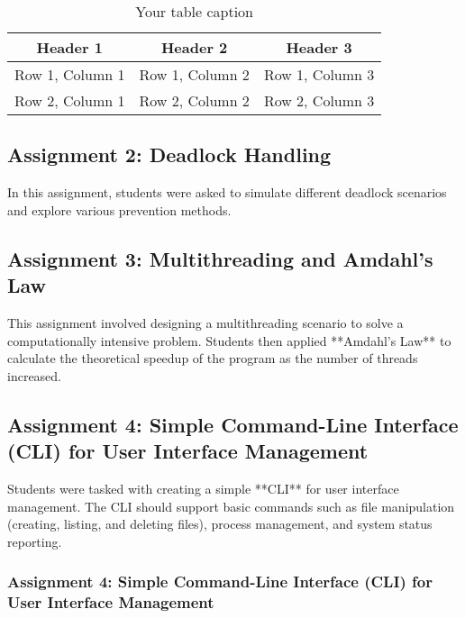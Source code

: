 \documentclass[12pt]{article}
\begin{document}
\begin{table}[htbp] %
    \centering
    \begin{tabular}{|c|c|c|} %
    \hline
    Header 1 & Header 2 & Header 3 \\ %
    \hline
    Row 1, Column 1 & Row 1, Column 2 & Row 1, Column 3 \\ %
    \hline
    Row 2, Column 1 & Row 2, Column 2 & Row 2, Column 3 \\ %
    \hline
    \end{tabular}
    \caption{Your table caption} %
    \label{tab:your_label} %
\end{table}

\subsection{Assignment 2: Deadlock Handling}
In this assignment, students were asked to simulate different deadlock scenarios and explore various prevention methods.

\subsection{Assignment 3: Multithreading and Amdahl's Law}
This assignment involved designing a multithreading scenario to solve a computationally intensive problem. Students then applied **Amdahl's Law** to calculate the theoretical speedup of the program as the number of threads increased.

\subsection{Assignment 4: Simple Command-Line Interface (CLI) for User Interface Management}
Students were tasked with creating a simple **CLI** for user interface management. The CLI should support basic commands such as file manipulation (creating, listing, and deleting files), process management, and system status reporting.

\subsubsection{Assignment 4: Simple Command-Line Interface (CLI) for User Interface Management}
\end{document}
